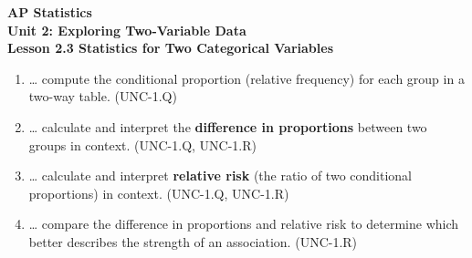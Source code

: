 \documentclass[10pt]{article}
\begin{document}
\vspace{-0.8in}

\begin{center}
  {\color{white}\textbf{\LARGE AP Statistics}}\\[4pt]
  {\color{skymid}\large\textbf{Unit 2: Exploring Two-Variable Data}}\\[6pt]
  {\color{white}\textbf{\large Lesson 2.3 \quad Statistics for Two Categorical Variables}}
\end{center}

\vspace{0.22in}

\namedateperiod

\vspace{0.18in}

\begin{learningtargetbox}
\small
\begin{enumerate}[leftmargin=1.5em, itemsep=5pt]
  \item \ldots{} compute the conditional proportion (relative frequency) for each group in a
        two-way table. \hfill\textcolor{slate}{\small(UNC-1.Q)}
  \item \ldots{} calculate and interpret the \textbf{difference in proportions} between two
        groups in context. \hfill\textcolor{slate}{\small(UNC-1.Q, UNC-1.R)}
  \item \ldots{} calculate and interpret \textbf{relative risk} (the ratio of two conditional
        proportions) in context. \hfill\textcolor{slate}{\small(UNC-1.Q, UNC-1.R)}
  \item \ldots{} compare the difference in proportions and relative risk to determine which
        better describes the strength of an association. \hfill\textcolor{slate}{\small(UNC-1.R)}
\end{enumerate}
\end{learningtargetbox}

\vspace{0.14in}
\end{document}

